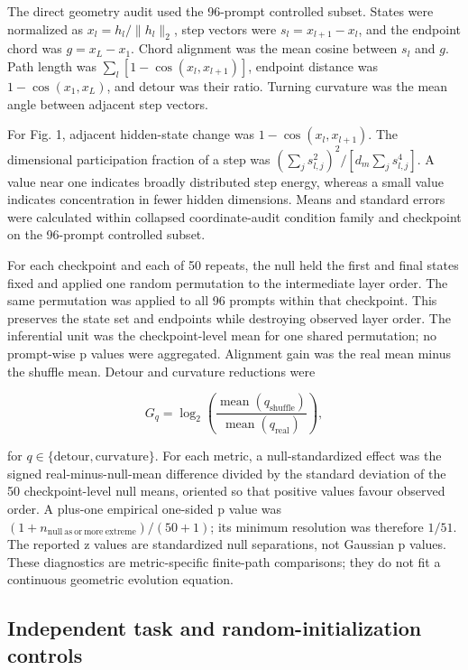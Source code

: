 \documentclass[12pt]{article}
\begin{document}
The direct geometry audit used the 96-prompt controlled subset. States were normalized as \(x_l=h_l/\lVert h_l\rVert_2\), step vectors were \(s_l=x_{l+1}-x_l\), and the endpoint chord was \(g=x_L-x_1\). Chord alignment was the mean cosine between \(s_l\) and \(g\). Path length was \(\sum_l[1-\cos(x_l,x_{l+1})]\), endpoint distance was \(1-\cos(x_1,x_L)\), and detour was their ratio. Turning curvature was the mean angle between adjacent step vectors.

For Fig. 1, adjacent hidden-state change was \(1-\cos(x_l,x_{l+1})\). The dimensional participation fraction of a step was \((\sum_j s_{l,j}^2)^2/[d_m\sum_j s_{l,j}^4]\). A value near one indicates broadly distributed step energy, whereas a small value indicates concentration in fewer hidden dimensions. Means and standard errors were calculated within collapsed coordinate-audit condition family and checkpoint on the 96-prompt controlled subset.

For each checkpoint and each of 50 repeats, the null held the first and final states fixed and applied one random permutation to the intermediate layer order. The same permutation was applied to all 96 prompts within that checkpoint. This preserves the state set and endpoints while destroying observed layer order. The inferential unit was the checkpoint-level mean for one shared permutation; no prompt-wise p values were aggregated. Alignment gain was the real mean minus the shuffle mean. Detour and curvature reductions were

\[
G_q=\log_2\left(\frac{\operatorname{mean}(q_{\mathrm{shuffle}})}{\operatorname{mean}(q_{\mathrm{real}})}\right),
\]

for \(q\in\{\mathrm{detour},\mathrm{curvature}\}\). For each metric, a null-standardized effect was the signed real-minus-null-mean difference divided by the standard deviation of the 50 checkpoint-level null means, oriented so that positive values favour observed order. A plus-one empirical one-sided p value was \((1+n_{\mathrm{null\ as\ or\ more\ extreme}})/(50+1)\); its minimum resolution was therefore \(1/51\). The reported z values are standardized null separations, not Gaussian p values. These diagnostics are metric-specific finite-path comparisons; they do not fit a continuous geometric evolution equation.

\subsection*{Independent task and random-initialization controls}
\end{document}
